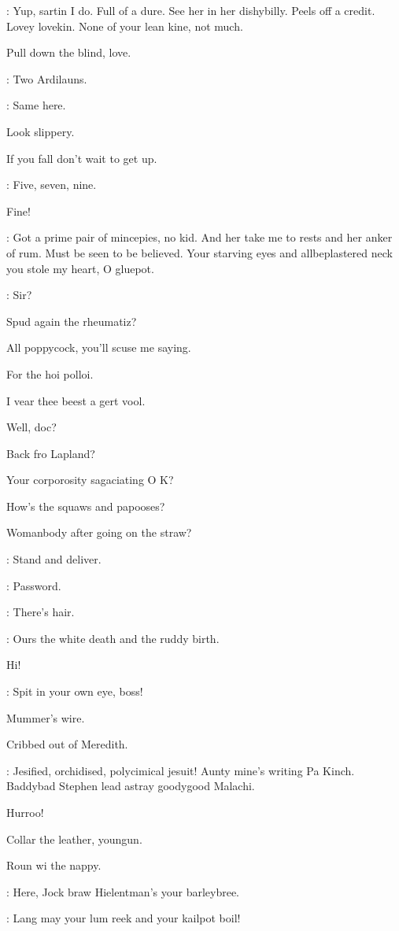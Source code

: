 \dixon:
Yup,
sartin I do.
Full of a dure.
See her in her dishybilly.
Peels off a credit.
Lovey lovekin.
None of your lean kine,
not much.

Pull down the blind,
love.

\madden:
Two Ardilauns.

\lynch:
Same here.

Look slippery.

If you fall don't wait to get up.

\barman:
Five,
seven,
nine.

Fine!

\dixon:
Got a prime pair of mincepies,
no kid.
And her take me to rests and her anker of rum.
Must be seen to be believed.
Your starving eyes and allbeplastered neck you stole my heart,
O gluepot.

\barman:
Sir?

Spud again the rheumatiz?

All poppycock,
you'll scuse me saying.

For the hoi polloi.

I vear thee beest a gert vool.

Well,
doc?

Back fro Lapland?

Your corporosity sagaciating O K?

How's the squaws and papooses?

Womanbody after going on the straw?

\lenehan:
Stand and deliver.

\crotthers:
Password.

\punch:
There's hair.

\Bloom:
Ours the white death and the ruddy birth.

Hi!

\bannon:
Spit in your own eye,
boss!

Mummer's wire.

Cribbed out of Meredith.

\mulligan:
Jesified,
orchidised,
polycimical jesuit!
Aunty mine's writing Pa Kinch.
Baddybad Stephen lead astray goodygood Malachi.


Hurroo!

Collar the leather,
youngun.

Roun wi the nappy.

\lenehan:
Here,
Jock braw Hielentman's your barleybree.

\crotthers:
Lang may your lum reek and your kailpot boil!

